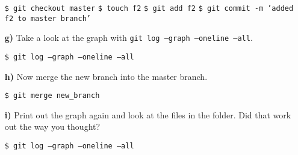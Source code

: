 \documentclass[11pt]{article}
\begin{document}
\begin{itemize}
\begin{framed}
\texttt{\$ git checkout master} \newline
\texttt{\$ touch f2} \newline
\texttt{\$ git add f2} \newline
\texttt{\$ git commit -m 'added f2 to master branch'}
\end{framed}
\item[\bf{g)}] Take a look at the graph with \texttt{git log --graph --oneline --all}.
\begin{framed}
\texttt{\$ git log --graph --oneline --all}
\end{framed}
\item[\bf{h)}] Now merge the new branch into the master branch.
\begin{framed}
\texttt{\$ git merge new\_branch}
\end{framed}
\item[\bf{i)}] Print out the graph again and look at the files in the folder. Did that work out the way you thought?
\begin{framed}
\texttt{\$ git log --graph --oneline --all}
\end{framed}
\end{itemize}
\end{document}
